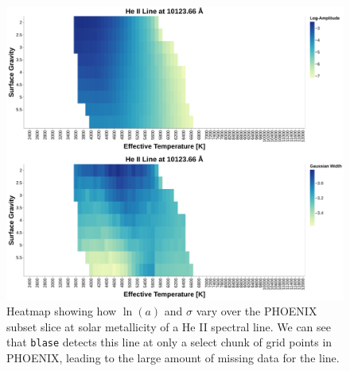 \documentclass[twocolumn, linenumbers]{aastex631}
\begin{document}
\begin{figure}
    \centering
    \includegraphics[width=\textwidth]{figure4}
    \caption{Heatmap showing how $\ln(a)$ and $\sigma$ vary over the PHOENIX subset slice at solar metallicity of a He II spectral line.
    We can see that \texttt{blase} detects this line at only a select chunk of grid points in PHOENIX, leading to the large amount of missing data for the line.}
    \label{fig:figure4}
\end{figure}
\end{document}
